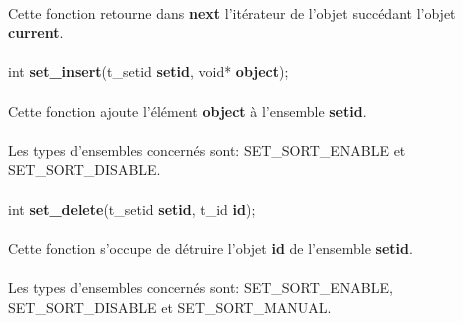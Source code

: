 \documentclass[10pt,a4wide]{article}
\begin{document}
\paragraph{}

Cette fonction retourne dans \textbf{next} l'it\'erateur de l'objet
succ\'edant l'objet \textbf{current}.

\paragraph{}

\hspace{1.5cm}int \textbf{set\_insert}(t\_setid \textbf{setid},
                                       void* \textbf{object});

\paragraph{}

Cette fonction ajoute l'\'el\'ement \textbf{object} \`a l'ensemble
\textbf{setid}.

\paragraph{}

Les types d'ensembles concern\'es sont: SET\_SORT\_ENABLE et
SET\_SORT\_DISABLE.

\paragraph{}

\hspace{1.5cm}int \textbf{set\_delete}(t\_setid \textbf{setid},
                                       t\_id \textbf{id});

\paragraph{}

Cette fonction s'occupe de d\'etruire l'objet \textbf{id} de l'ensemble
\textbf{setid}.

\paragraph{}

Les types d'ensembles concern\'es sont: SET\_SORT\_ENABLE,
SET\_SORT\_DISABLE et SET\_SORT\_MANUAL.

\paragraph{}
\end{document}
